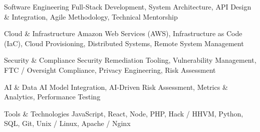 

\begin{cvparagraph}

  \skillitem
    {Software Engineering} %
    {Full-Stack Development, System Architecture, API Design \& Integration, Agile Methodology, Technical Mentorship} %

  \skillitem
    {Cloud \& Infrastructure} %
    {Amazon Web Services (AWS), Infrastructure as Code (IaC), Cloud Provisioning, Distributed Systems, Remote System Management} %

  \skillitem
    {Security \& Compliance} %
    {Security Remediation Tooling, Vulnerability Management, FTC / Oversight Compliance, Privacy Engineering, Risk Assessment} %

  \skillitem
    {AI \& Data} %
    {AI Model Integration, AI-Driven Risk Assessment, Metrics \& Analytics, Performance Testing} %

  \skillitem
    {Tools \& Technologies} %
    {JavaScript, React, Node, PHP, Hack / HHVM, Python, SQL, Git, Unix / Linux, Apache / Nginx} %

\end{cvparagraph}
